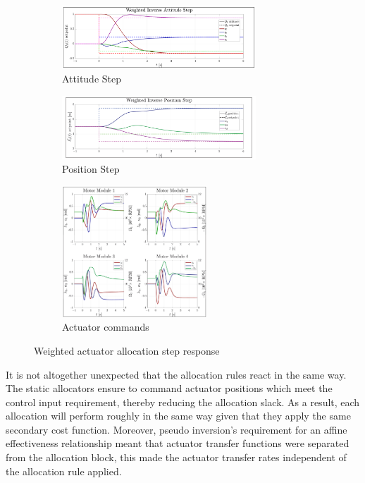 \begin{figure}[hbtp]
\centering
\begin{subfigure}{\textwidth}
\centering
\includegraphics[width=0.8\textwidth]{graphs/weighted_inverse_attitude}
\vspace{-6pt}
\caption{Attitude Step}
\label{fig:weighted_inverse_attitude}
\end{subfigure}
\begin{subfigure}{\textwidth}
\centering
\includegraphics[width=0.8\textwidth]{graphs/weighted_inverse_position}
\vspace{-2pt}
\caption{Position Step}
\label{fig:weighted_inverse_position}
\end{subfigure}
\vspace{-8pt}
\begin{subfigure}{\textwidth}
\centering
\includegraphics[width=0.6\textwidth]{graphs/body_norm_input}
\caption{Actuator commands}
\label{fig:weighted_inverse_input}
\end{subfigure}
\caption{Weighted actuator allocation step response}
\label{fig:weighted-inverse-step}
\vspace{-16pt}
\end{figure}
\par
It is not altogether unexpected that the allocation rules react in the same way. The static allocators ensure to command actuator positions which meet the control input requirement, thereby reducing the allocation slack. As a result, each allocation will perform roughly in the same way given that they apply the same secondary cost function. Moreover, pseudo inversion's requirement for an affine effectiveness relationship meant that actuator transfer functions were separated from the allocation block, this made the actuator transfer rates independent of the allocation rule applied.
